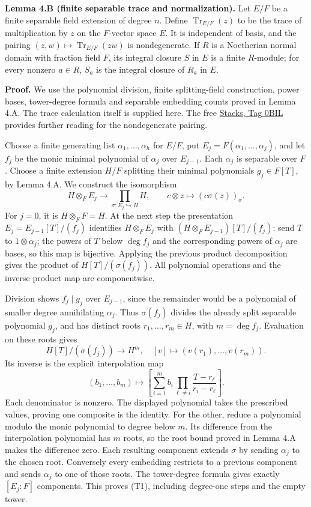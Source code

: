 \documentclass[11pt,a4paper,openany]{report}
\begin{document}
\textbf{Lemma 4.B (finite separable trace and normalization).} Let \(E/F\) be a finite separable field extension of degree \(n\). Define \(\operatorname{Tr}_{E/F}(z)\) to be the trace of multiplication by \(z\) on the \(F\)-vector space \(E\). It is independent of basis, and the pairing \((z,w)\mapsto\operatorname{Tr}_{E/F}(zw)\) is nondegenerate. If \(R\) is a Noetherian normal domain with fraction field \(F\), its integral closure \(S\) in \(E\) is a finite \(R\)-module; for every nonzero \(a\in R\), \(S_a\) is the integral closure of \(R_a\) in \(E\).

\textbf{Proof.} We use the polynomial division, finite splitting-field construction, power bases, tower-degree formula and separable embedding counts proved in Lemma 4.A. The trace calculation itself is supplied here. The free \href{https://stacks.math.columbia.edu/tag/0BIL}{Stacks, Tag 0BIL} provides further reading for the nondegenerate pairing.

Choose a finite generating list \(\alpha_1,\ldots,\alpha_h\) for \(E/F\), put \(E_j=F(\alpha_1,\ldots,\alpha_j)\), and let \(f_j\) be the monic minimal polynomial of \(\alpha_j\) over \(E_{j-1}\). Each \(\alpha_j\) is separable over \(F\). Choose a finite extension \(H/F\) splitting their minimal polynomials \(g_j\in F[T]\), by Lemma 4.A. We construct the isomorphism \[
H\otimes_F E_j\longrightarrow
   \prod_{\sigma:E_j\hookrightarrow H}H,
\qquad c\otimes z\longmapsto(c\sigma(z))_\sigma. \tag{T1}
\] For \(j=0\), it is \(H\otimes_F F=H\). At the next step the presentation \(E_j=E_{j-1}[T]/(f_j)\) identifies \(H\otimes_F E_j\) with \((H\otimes_F E_{j-1})[T]/(f_j)\): send \(T\) to \(1\otimes\alpha_j\); the powers of \(T\) below \(\deg f_j\) and the corresponding powers of \(\alpha_j\) are bases, so this map is bijective. Applying the previous product decomposition gives the product of \(H[T]/(\sigma(f_j))\). All polynomial operations and the inverse product map are componentwise.

Division shows \(f_j\mid g_j\) over \(E_{j-1}\), since the remainder would be a polynomial of smaller degree annihilating \(\alpha_j\). Thus \(\sigma(f_j)\) divides the already split separable polynomial \(g_j\), and has distinct roots \(r_1,\ldots,r_m\in H\), with \(m=\deg f_j\). Evaluation on these roots gives \[
H[T]/(\sigma(f_j))\longrightarrow H^m,
\quad [v]\longmapsto(v(r_1),\ldots,v(r_m)).
\] Its inverse is the explicit interpolation map \[
(b_1,\ldots,b_m)\longmapsto
 \left[\sum_{i=1}^m b_i
    \prod_{\ell\ne i}\frac{T-r_\ell}{r_i-r_\ell}\right]. \tag{T2}
\] Each denominator is nonzero. The displayed polynomial takes the prescribed values, proving one composite is the identity. For the other, reduce a polynomial modulo the monic polynomial to degree below \(m\). Its difference from the interpolation polynomial has \(m\) roots, so the root bound proved in Lemma 4.A makes the difference zero. Each resulting component extends \(\sigma\) by sending \(\alpha_j\) to the chosen root. Conversely every embedding restricts to a previous component and sends \(\alpha_j\) to one of those roots. The tower-degree formula gives exactly \([E_j:F]\) components. This proves (T1), including degree-one steps and the empty tower.
\end{document}

